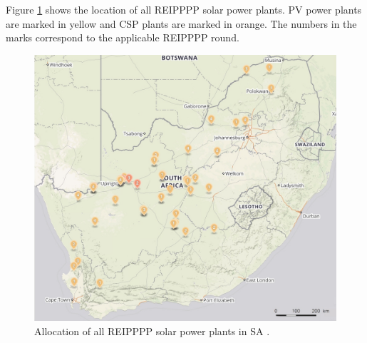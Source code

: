 
Figure \ref{Solar-map} shows the location of all \ac{REIPPPP} solar power plants. \ac{PV} power plants are marked in yellow and \ac{CSP} plants are marked in orange. The numbers in the marks correspond to the applicable \ac{REIPPPP} round.

\begin{figure}[h!]
\centering
\includegraphics[width=0.8\linewidth]{FIG/Solar-map}
\caption[Allocation of all REIPPPP solar power plants in SA.]{Allocation of all REIPPPP solar power plants in SA \cite{Forder2015}.}\label{Solar-map}
\end{figure}

%

